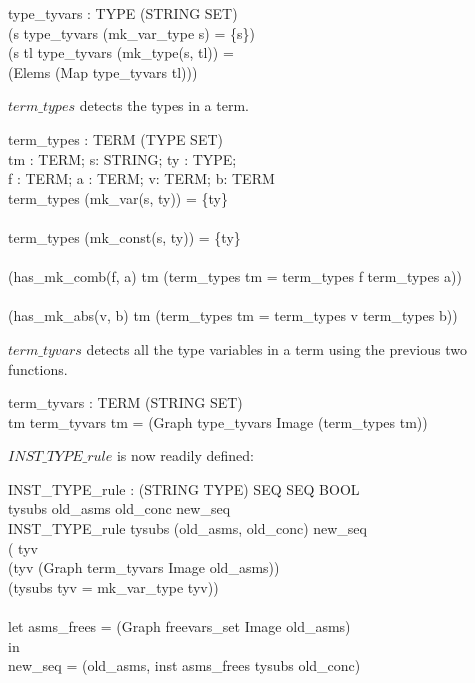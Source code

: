 \documentclass[a4paper,11pt,titlepage]{article}
\begin{document}
\begin{titlepage}
\begin{HOLConst}
\+	\PrNL{}type\_tyvars\PrNN{} :  TYPE \MMM{\rightarrow} (STRING SET)\\
\PrPH{}
\+		(\MMM{\forall}s\MMM{\bullet}  type\_tyvars (mk\_var\_type s) = \{s\})\\
\+	\MMM{\land}	(\MMM{\forall}s tl\MMM{\bullet} type\_tyvars (mk\_type(s, tl)) =\\
\+			\MMM{\bigcup} (Elems (Map type\_tyvars tl)))\\
\end{HOLConst}
$term\_types$ detects the types in a term.
\begin{HOLConst}
\+	\PrNL{}term\_types\PrNN{} :  TERM \MMM{\rightarrow} (TYPE SET)\\
\PrPH{}
\+	\MMM{\forall} tm : TERM; s: STRING; ty : TYPE;\\
\+	f : TERM; a : TERM; v: TERM; b: TERM\MMM{\bullet}\\
\+	term\_types (mk\_var(s, ty)) = \{ty\}\\
\+	\MMM{\land}\\
\+	term\_types (mk\_const(s, ty)) = \{ty\}\\
\+	\MMM{\land}\\
\+	(has\_mk\_comb(f, a) tm \MMM{\Rightarrow} (term\_types tm = term\_types f \MMM{\cup} term\_types a))\\
\+	\MMM{\land}\\
\+	(has\_mk\_abs(v, b) tm \MMM{\Rightarrow} (term\_types tm = term\_types v \MMM{\cup} term\_types b))\\
\end{HOLConst}
$term\_tyvars$ detects all the type variables
in a term using the previous two functions.
\begin{HOLConst}
\+	\PrNL{}term\_tyvars\PrNN{} :  TERM \MMM{\rightarrow} (STRING SET)\\
\PrPH{}
\+	\MMM{\forall}tm \MMM{\bullet} term\_tyvars tm = \MMM{\bigcup}(Graph type\_tyvars Image (term\_types tm))\\
\end{HOLConst}
$INST\_TYPE\_rule$ is now readily defined:
\begin{HOLConst}
\+	\PrNL{}INST\_TYPE\_rule\PrNN{} : (STRING \MMM{\rightarrow} TYPE) \MMM{\rightarrow} SEQ \MMM{\rightarrow} SEQ \MMM{\rightarrow} BOOL\\
\PrPH{}
\+	\MMM{\forall} tysubs old\_asms old\_conc new\_seq\MMM{\bullet}\\
\+	INST\_TYPE\_rule tysubs (old\_asms, old\_conc) new\_seq \MMM{\Leftrightarrow}\\
\+	(\MMM{\forall} tyv \MMM{\bullet}\\
\+		(tyv \MMM{\in} \MMM{\bigcup} (Graph term\_tyvars Image old\_asms)) \MMM{\Rightarrow}\\
\+		(tysubs tyv = mk\_var\_type tyv))\\
\+	\MMM{\land}\\
\+	let asms\_frees = \MMM{\bigcup} (Graph freevars\_set Image old\_asms)\\
\+	in\\
\+		new\_seq = (old\_asms, inst asms\_frees tysubs old\_conc)\\
\end{HOLConst}



\end{titlepage}
\end{document}
